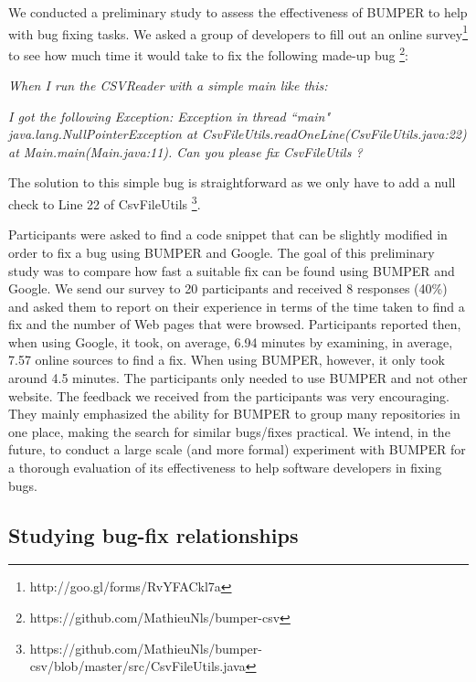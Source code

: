 \documentclass[conference]{IEEEtran}
\begin{document}
We conducted a preliminary study to assess the effectiveness of BUMPER
to help with bug fixing tasks. We asked  a group of developers to fill out
an online survey\footnote{http://goo.gl/forms/RvYFACkl7a} to see how much
 time it would take to fix the following made-up bug
 \footnote{https://github.com/MathieuNls/bumper-csv}:

\textit{When I run the CSVReader with a simple main like this:}

\noindent\begin{minipage}{0.90\linewidth}

 

\end{minipage}

\textit{I got the following Exception: Exception in thread ``main" java.lang.NullPointerException at CsvFileUtils.readOneLine(CsvFileUtils.java:22) at Main.main(Main.java:11). Can you please fix CsvFileUtils ?}


The solution to this simple bug is straightforward as we only have to add a
null check to Line 22 of CsvFileUtils
\footnote{https://github.com/MathieuNls/bumper-csv/blob/master/src/CsvFileUtils.java}.

Participants were asked to find a code snippet that can be slightly modified in
 order to fix a bug using BUMPER and Google. The goal of this preliminary study
 was to compare how fast a suitable fix can be found using BUMPER and Google.
We send our survey to 20 participants and received 8 responses (40\%) and asked
them to report on their experience in terms of the time taken to find a fix and
the number of Web pages that were browsed.
Participants reported then, when using Google, it took, on average, 6.94 minutes
 by examining, in average, 7.57 online sources to find a fix.
When using BUMPER, however, it only took around 4.5 minutes.
The participants only needed to use BUMPER and not other website.
The feedback we received from the participants was very encouraging.
They mainly emphasized the ability for BUMPER to group many repositories
in one place, making the search for similar bugs/fixes practical.
We intend, in the future, to conduct a large scale (and more formal) experiment
with BUMPER for a thorough evaluation of its effectiveness to help software
developers in fixing bugs.

\subsection{Studying bug-fix relationships}
\label{subs:Studying bug-fix relationships}
\end{document}
